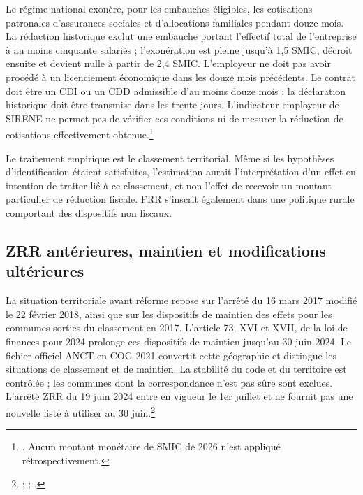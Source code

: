 Le régime national exonère, pour les embauches éligibles, les cotisations patronales d’assurances sociales et d’allocations familiales pendant douze mois. La rédaction historique exclut une embauche portant l’effectif total de l’entreprise à au moins cinquante salariés ; l’exonération est pleine jusqu’à 1,5 SMIC, décroît ensuite et devient nulle à partir de 2,4 SMIC. L’employeur ne doit pas avoir procédé à un licenciement économique dans les douze mois précédents. Le contrat doit être un CDI ou un CDD admissible d’au moins douze mois ; la déclaration historique doit être transmise dans les trente jours. L’indicateur employeur de SIRENE ne permet pas de vérifier ces conditions ni de mesurer la réduction de cotisations effectivement obtenue.\footnote{. Aucun montant monétaire de SMIC de 2026 n’est appliqué rétrospectivement.}

Le traitement empirique est le classement territorial. Même si les hypothèses d’identification étaient satisfaites, l’estimation aurait l’interprétation d’un effet en intention de traiter lié à ce classement, et non l’effet de recevoir un montant particulier de réduction fiscale. FRR s’inscrit également dans une politique rurale comportant des dispositifs non fiscaux.

\subsection{ZRR antérieures, maintien et modifications ultérieures}
La situation territoriale avant réforme repose sur l’arrêté du 16 mars 2017 modifié le 22 février 2018, ainsi que sur les dispositifs de maintien des effets pour les communes sorties du classement en 2017. L’article 73, XVI et XVII, de la loi de finances pour 2024 prolonge ces dispositifs de maintien jusqu’au 30 juin 2024. Le fichier officiel ANCT en COG 2021 convertit cette géographie et distingue les situations de classement et de maintien. La stabilité du code et du territoire est contrôlée ; les communes dont la correspondance n’est pas sûre sont exclues. L’arrêté ZRR du 19 juin 2024 entre en vigueur le 1er juillet et ne fournit pas une nouvelle liste à utiliser au 30 juin.\footnote{ ;  ; .}

